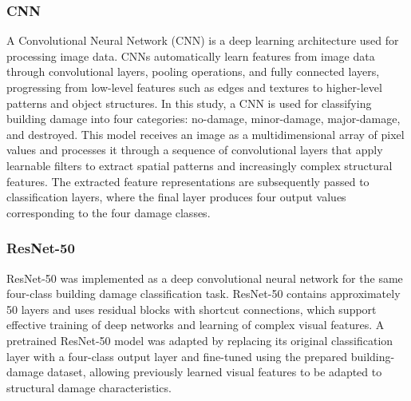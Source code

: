 \documentclass[conference]{IEEEtran}
\begin{document}
\subsubsection{CNN}
{A Convolutional Neural Network (CNN) is a deep learning architecture used for processing image data. CNNs automatically learn features from image data through convolutional layers, pooling operations, and fully connected layers, progressing from low-level features such as edges and textures to higher-level patterns and object structures. In this study, a CNN is used for classifying building damage into four categories: no-damage, minor-damage, major-damage, and destroyed. This model receives an image as a multidimensional array of pixel values and processes it through a sequence of convolutional layers that apply learnable filters to extract spatial patterns and increasingly complex structural features. The extracted feature representations are subsequently passed to classification layers, where the final layer produces four output values corresponding to the four damage classes. %
\subsubsection{ResNet-50}
{ResNet-50 was implemented as a deep convolutional neural network for the same four-class building damage classification task. ResNet-50 contains approximately 50 layers and uses residual blocks with shortcut connections, which support effective training of deep networks and learning of complex visual features. A pretrained ResNet-50 model was adapted by replacing its original classification layer with a four-class output layer and fine-tuned using the prepared building-damage dataset, allowing previously learned visual features to be adapted to structural damage characteristics. 
}}
\end{document}
